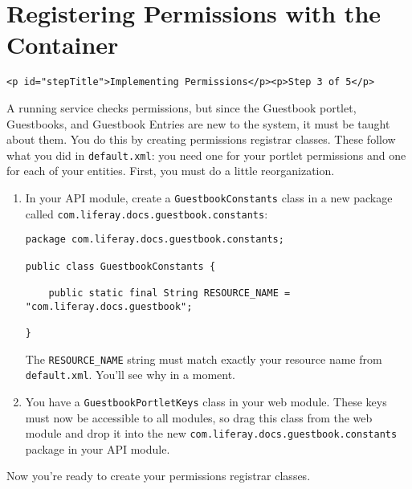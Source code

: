 \chapter{Registering Permissions with the
Container}\label{registering-permissions-with-the-container}

\begin{verbatim}
<p id="stepTitle">Implementing Permissions</p><p>Step 3 of 5</p>
\end{verbatim}

A running service checks permissions, but since the Guestbook portlet,
Guestbooks, and Guestbook Entries are new to the system, it must be
taught about them. You do this by creating permissions registrar
classes. These follow what you did in \texttt{default.xml}: you need one
for your portlet permissions and one for each of your entities. First,
you must do a little reorganization.

\begin{enumerate}
\def\labelenumi{\arabic{enumi}.}
\item
  In your API module, create a \texttt{GuestbookConstants} class in a
  new package called \texttt{com.liferay.docs.guestbook.constants}:

\begin{verbatim}
package com.liferay.docs.guestbook.constants;

public class GuestbookConstants {

    public static final String RESOURCE_NAME = "com.liferay.docs.guestbook";

}
\end{verbatim}

  The \texttt{RESOURCE\_NAME} string must match exactly your resource
  name from \texttt{default.xml}. You'll see why in a moment.
\item
  You have a \texttt{GuestbookPortletKeys} class in your web module.
  These keys must now be accessible to all modules, so drag this class
  from the web module and drop it into the new
  \texttt{com.liferay.docs.guestbook.constants} package in your API
  module.
\end{enumerate}

Now you're ready to create your permissions registrar classes.

